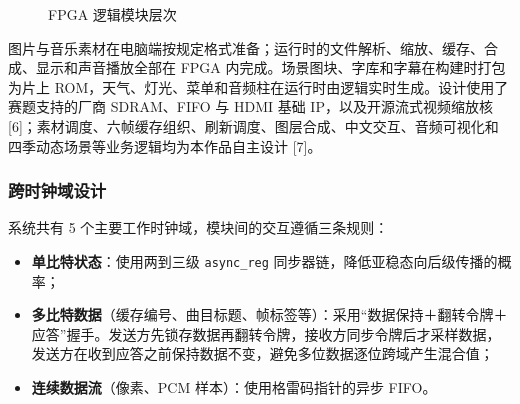 \begin{figure}[H]
\caption{FPGA 逻辑模块层次}\label{fig:hierarchy}
\end{figure}

图片与音乐素材在电脑端按规定格式准备；运行时的文件解析、缩放、缓存、合成、显示和声音播放全部在 FPGA 内完成。场景图块、字库和字幕在构建时打包为片上 ROM，天气、灯光、菜单和音频柱在运行时由逻辑实时生成。设计使用了赛题支持的厂商 SDRAM、FIFO 与 HDMI 基础 IP，以及开源流式视频缩放核 [6]；素材调度、六帧缓存组织、刷新调度、图层合成、中文交互、音频可视化和四季动态场景等业务逻辑均为本作品自主设计 [7]。

\subsubsection{跨时钟域设计}
系统共有 5 个主要工作时钟域，模块间的交互遵循三条规则：
\begin{itemize}
\item \textbf{单比特状态}：使用两到三级 \texttt{async\_reg} 同步器链，降低亚稳态向后级传播的概率；
\item \textbf{多比特数据}（缓存编号、曲目标题、帧标签等）：采用“数据保持＋翻转令牌＋应答”握手。发送方先锁存数据再翻转令牌，接收方同步令牌后才采样数据，发送方在收到应答之前保持数据不变，避免多位数据逐位跨域产生混合值；
\item \textbf{连续数据流}（像素、PCM 样本）：使用格雷码指针的异步 FIFO。
\end{itemize}

